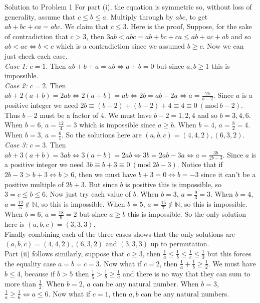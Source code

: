 \documentclass{article}
\begin{document}
\begin{solution}{Solution to Problem 1}
For part (i), the equation is symmetric so, without loss of generality,
assume that $c \leq b \leq a$. Multiply through by $abc$, to get
$ab + bc + ca = abc$. We claim that $c \leq 3$. Here is the proof,
Suppose, for the sake of contradiction that $c > 3$, then
$3ab < abc = ab + bc + ca \leq ab + ac + ab$ and so $ab < ac \iff b < c$
which is a contradiction since we assumed $b \geq c$. Now we can just check
each case.\\

\textit{Case 1:} $c = 1$. Then $ab + b + a = ab \iff a + b = 0$ but since
$a,b \geq 1$ this is impossible.\\

\textit{Case 2:} $c = 2$. Then $ab + 2(a+b) = 2ab \iff 2(a+b) = ab \iff
2b = ab - 2a \iff a = \frac{2b}{b-2}$. Since $a$ is a positive integer we
need $2b \equiv (b-2) + (b-2) + 4 \equiv 4 \equiv 0 \ (\text{mod} \ b-2)$.
Thus $b-2$ must be a factor of 4. We must have $b-2 = 1,2,4$ and so
$b = 3,4,6$. When $b = 6$, $a = \frac{12}{4} = 3$ which is impossible
since $a \geq b$. When $b = 4$, $a = \frac{8}{2} = 4$. When $b = 3$,
$a = \frac{6}{1}$. So the solutions here are $(a,b,c) = (4,4,2), (6,3,2)$.
\\

\textit{Case 3:} $c = 3$. Then $ab + 3(a + b) = 3ab \iff 3(a+b) = 2ab \iff
3b = 2ab - 3a \iff a = \frac{3b}{2b-3}$. Since $a$ is a positive integer
we need $3b \equiv b + 3 \equiv 0 \ (\text{mod} \ 2b-3)$. Notice that if
$2b - 3 > b + 3 \iff b > 6$, then we must have $b + 3 = 0 \iff b = -3$
since it can't be a positive multiple of $2b + 3$. But since $b$ is
positive this is impossible, so $3 = c \leq b \leq 6$. Now just try each
value of $b$. When $b = 3$, $a = \frac{9}{3} = 3$. When $b = 4$,
$a = \frac{12}{5} \notin \mathbb{N}$, so this is impossible. When $b = 5$,
$a = \frac{15}{7} \notin \mathbb{N}$, so this is impossible. When $b = 6$,
$a = \frac{18}{9} = 2$ but since $a \geq b$ this is impossible. So the only
solution here is $(a,b,c) = (3,3,3)$.\\

Finally combining each of the three cases shows that the only solutions are
$(a,b,c) = (4,4,2), (6,3,2)$ and $(3,3,3)$ up to permutation.\\

Part (ii) follows similarly, suppose that $c \geq 3$, then
$\frac{1}{a} \leq \frac{1}{b} \leq \frac{1}{c} \leq \frac{1}{3}$ but this
forces the equality case $a=b=c=3$. Now what if $c = 2$, then
$\frac{1}{a} + \frac{1}{b} \geq \frac{1}{2}$. We must have $b \leq 4$,
because if $b > 5$ then $\frac{1}{5} > \frac{1}{b} \geq \frac{1}{a}$ and
there is no way that they can sum to more than $\frac{1}{2}$. When $b = 2$,
$a$ can be any natural number. When $b = 3$, $\frac{1}{a} \geq \frac{1}{6}
\iff a\leq 6$. Now what if $c=1$, then $a,b$ can be any natural numbers.\\
\end{solution}
\end{document}

